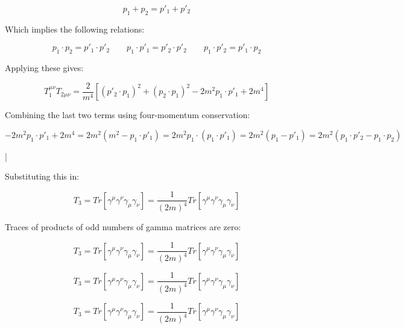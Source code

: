 \documentclass[a4]{article}
\begin{document}
    \begin{equation}
        p_1 + p_2 = p'_1 + p'_2
    \end{equation}

    Which implies the following relations:

    \begin{equation}
        p_1 \cdot p_2 = p'_1 \cdot p'_2 \qquad p_1 \cdot p'_1 = p'_2 \cdot p'_2 \qquad p_1 \cdot p'_2 = p'_1 \cdot p_2
    \end{equation}

    Applying these gives:

    \begin{equation}
        T_1^{\mu \nu} T_{2 \mu \nu} = \frac{2}{m^4} [(p'_2 \cdot p_1)^2 + (p_2 \cdot p_1)^2 - 2 m^2 p_1 \cdot p'_1 + 2m^4]
    \end{equation}

    Combining the last two terms using four-momentum conservation:
    
    \begin{equation}
        -2 m^2 p_1 \cdot p'_1 + 2 m^4 = 2 m^2 (m^2 - p_1 \cdot p'_1) = 2 m^2 p_1 \cdot (p_1 \cdot p'_1) = 2 m^2 (p_1 - p'_1) = 2 m^2 (p_1 \cdot p'_2 - p_1 \cdot p_2)
    \end{equation}

    \begin{framed}
        |
    \end{framed}

    Substituting this in:

    \begin{equation}
        T_3 = Tr [\gamma^\mu \gamma^\nu \gamma_\mu \gamma_\nu] = \frac{1}{(2 m)^4} Tr [\gamma^\mu \gamma^\nu \gamma_\mu \gamma_\nu]
    \end{equation}

    Traces of products of odd numbers of gamma matrices are zero:

    \begin{equation}
        T_3 = Tr [\gamma^\mu \gamma^\nu \gamma_\mu \gamma_\nu] = \frac{1}{(2 m)^4} Tr [\gamma^\mu \gamma^\nu \gamma_\mu \gamma_\nu]
    \end{equation}

    \begin{equation}
        T_3 = Tr [\gamma^\mu \gamma^\nu \gamma_\mu \gamma_\nu] = \frac{1}{(2 m)^4} Tr [\gamma^\mu \gamma^\nu \gamma_\mu \gamma_\nu]
    \end{equation}

    \begin{equation}
        T_3 = Tr [\gamma^\mu \gamma^\nu \gamma_\mu \gamma_\nu] = \frac{1}{(2 m)^4} Tr [\gamma^\mu \gamma^\nu \gamma_\mu \gamma_\nu]
    \end{equation}
\end{document}
